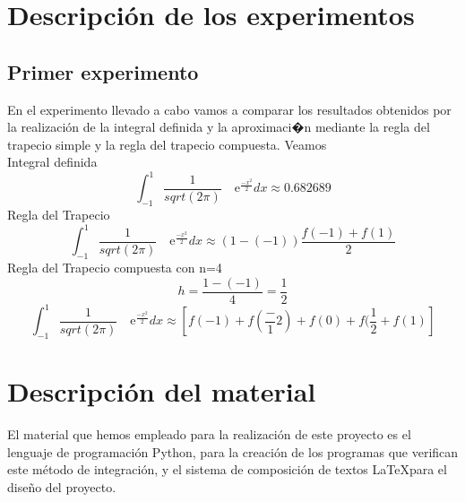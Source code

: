 


\section{Descripci\'on de los experimentos}
\label{3:sec:1}
\parindent=1cm
\raggedright
\subsection{Primer experimento}
En el experimento llevado a cabo vamos a comparar los resultados obtenidos por la realización de la integral definida y la aproximaci�n
mediante la regla del trapecio simple y la regla del trapecio compuesta. Veamos\\
Integral definida 
\[
\int_{-1}^{1} \frac{1}{sqrt(2\pi)} \quad\text{e}^{\frac{-x^2}{2}}dx\approx0.682689 
\]
Regla del Trapecio
\[
\int_{-1}^{1} \frac{1}{sqrt(2\pi)} \quad\text{e}^{\frac{-x^2}{2}}dx\approx\left(1-(-1)\right)\frac{f(-1)+f(1)}{2}
\]
Regla del Trapecio compuesta con n=4
\[
h=\frac{1-(-1)}{4} =\frac{1}{2} 
\]
\[
\int_{-1}^{1} \frac{1}{sqrt(2\pi)} \quad\text{e}^{\frac{-x^2}{2}}dx\approx\left[f(-1) + f(\frac-{1}{2}) + f(0) + f(\frac{1}{2} + f(1)\right]
\]

\section{Descripci\'on del material}
\label{3:sec:2}
\parindent=1cm
\raggedright
El material que hemos empleado para la realización de este proyecto es el lenguaje de
programación Python, para la creación de los programas que verifican este método de integración, 
y el sistema de composición de textos \LaTeX para el diseño del proyecto.

